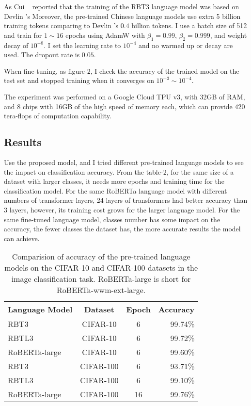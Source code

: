 \documentclass[review]{cvpr}
\begin{document}
As Cui \etal~\cite{cui2020revisiting} reported that the training of the RBT3 language model was based on Devlin \etal's
Moreover, the pre-trained Chinese language models use extra 5 billion training tokens comparing to Devlin \etal's 0.4 billion tokens.
I use a batch size of 512 and train for $1\sim16$ epochs using AdamW with $\beta_1=0.99$, $\beta_2=0.999$, and weight decay of $10^{-8}$.
I set the learning rate to $10^{-4}$ and no warmed up or decay are used.
The dropout rate is $0.05$.

\par When fine-tuning, as figure-2, I check the accuracy of the trained model on the test set and stopped training when it converges on $10^{-3}\sim10^{-4}$.

\par The experiment was performed on a Google Cloud TPU v3, with 32GB of RAM, and 8 chips with 16GB of the high speed of memory each,
which can provide 420 tera-flops of computation capability.

\subsection{Results}

Use the proposed model, and I tried different pre-trained language models to see the impact on classification accuracy.
From the table-2, for the same size of a dataset with larger classes, it needs more epochs and training time for the classification model.
For the same RoBERTa language model with different numbers of transformer layers, 24 layers of transformers had better accuracy than 3 layers,
however, its training cost grows for the larger language model.
For the same fine-tuned language model, classes number has some impact on the accuracy,
the fewer classes the dataset has, the more accurate results the model can achieve.


\begin{table}
\begin{center}
\begin{tabular}{|l|c|c|r|}
\hline
Language Model 	& Dataset & Epoch & Accuracy \\
\hline\hline
RBT3   & CIFAR-10 & 6	&	99.74\% \\
RBTL3  & CIFAR-10 & 6	&	99.72\% \\
RoBERTa-large  & CIFAR-10 & 6	&	99.60\% \\
\hline
RBT3   & CIFAR-100 & 6	&	93.71\% \\
RBTL3  & CIFAR-100 & 6  & 	99.10\% \\
RoBERTa-large & CIFAR-100 & 16 &	99.76\% \\
\hline
\end{tabular}
\end{center}
\caption{Comparision of accuracy of the pre-trained language models on the CIFAR-10 and CIFAR-100 datasets in the image classification task.
RoBERTa-large is short for RoBERTa-wwm-ext-large.}
\end{table}
\end{document}
